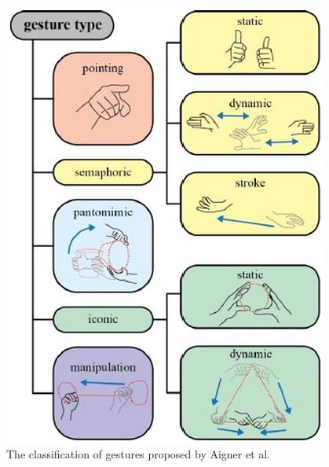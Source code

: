 \begin{figure}[htb]
\centering
 \includegraphics[width=0.5\columnwidth]{figures/gestureTypes.png}
 \caption[]{The classification of gestures proposed by Aigner et al.~\cite{AignerTaxonomy}}
 \label{gesturetypes}
\end{figure}

